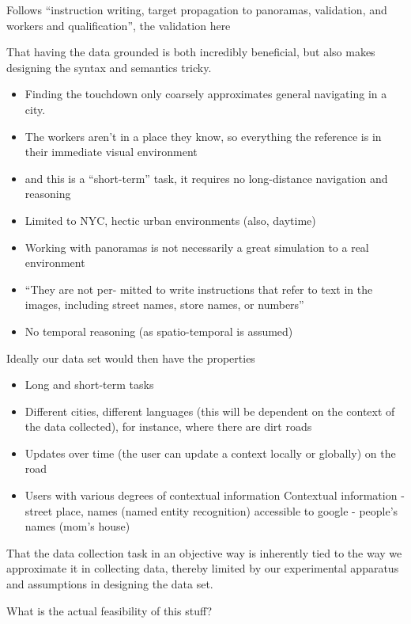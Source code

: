 \documentclass[a4paper, 11pt]{article}
\begin{document}
Follows ``instruction writing, target propagation to panoramas, validation, and
workers and qualification'', the validation here 

That having the data grounded is both incredibly beneficial, but also makes
designing the syntax and semantics tricky.

\begin{itemize}
\item Finding the touchdown only coarsely approximates general navigating in a city.
\item The workers
  aren't in a place they know, so everything the reference is in their immediate
  visual environment
\item and this is a ``short-term'' task, it requires no long-distance navigation
  and reasoning 
\item Limited to NYC, hectic urban environments (also, daytime)
\item Working with panoramas is not necessarily a great simulation to a real environment
\item ``They are not per- mitted to write instructions that refer to text in the
images, including street names, store names, or numbers''
\item No temporal reasoning (as spatio-temporal is assumed)
\end{itemize}

Ideally our data set would then have the properties

\begin{itemize}
\item Long and short-term tasks
\item Different cities, different languages (this will be dependent on the
  context of the data collected), for instance, where there are dirt roads
\item Updates over time (the user can update a context locally or globally) on
  the road
\item Users with various degrees of contextual information
  Contextual information
  - street place, names (named entity recognition) accessible to google
  - people's names (mom's house)
\end{itemize}

That the data collection task in an objective way is inherently tied to the way we approximate it in
collecting data, thereby limited by our experimental apparatus and assumptions
in designing the data set.

What is the actual feasibility of this stuff?
\end{document}
